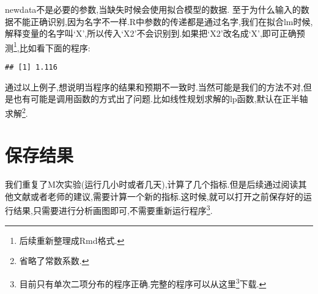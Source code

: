 \documentclass[]{ctexbook}
\newenvironment{Shaded}{\begin{snugshade}}{\end{snugshade}}
\newcommand{\DataTypeTok}[1]{\textcolor[rgb]{0.13,0.29,0.53}{#1}}
\newcommand{\DecValTok}[1]{\textcolor[rgb]{0.00,0.00,0.81}{#1}}
\newcommand{\FloatTok}[1]{\textcolor[rgb]{0.00,0.00,0.81}{#1}}
\newcommand{\KeywordTok}[1]{\textcolor[rgb]{0.13,0.29,0.53}{\textbf{#1}}}
\newcommand{\NormalTok}[1]{#1}
\newcommand{\OperatorTok}[1]{\textcolor[rgb]{0.81,0.36,0.00}{\textbf{#1}}}
\newcommand{\StringTok}[1]{\textcolor[rgb]{0.31,0.60,0.02}{#1}}
\renewcommand{\href}[2]{#2\footnote{\url{#1}}}
\begin{document}
newdata不是必要的参数,当缺失时候会使用拟合模型的数据.
至于为什么输入的数据不能正确识别,因为名字不一样.R中参数的传递都是通过名字,我们在拟合lm时候,解释变量的名字叫`X',所以传入`X2'不会识别到.如果把`X2'改名成`X',即可正确预测\footnote{后续重新整理成Rmd格式.},比如看下面的程序:

\begin{Shaded}
\end{Shaded}

\begin{verbatim}
## [1] 1.116
\end{verbatim}

通过以上例子,想说明当程序的结果和预期不一致时.当然可能是我们的方法不对,但是也有可能是调用函数的方式出了问题.比如线性规划求解的lp函数,默认在正半轴求解\footnote{省略了常数系数.}.

\hypertarget{section-6}{%
\section{保存结果}\label{section-6}}

我们重复了M次实验(运行几小时或者几天),计算了几个指标.但是后续通过阅读其他文献或者老师的建议,需要计算一个新的指标.这时候,就可以打开之前保存好的运行结果,只需要进行分析画图即可,不需要重新运行程序\footnote{目前只有单次二项分布的程序正确.完整的程序可以从\href{code/glm.R}{这里}下载.}.
\end{document}
